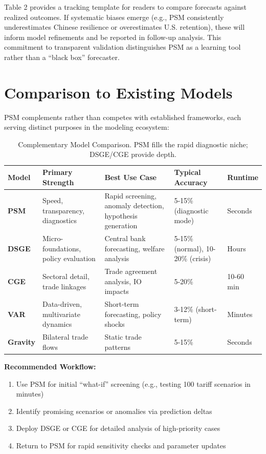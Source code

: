 \documentclass[11pt]{article}
\begin{document}
Table 2 provides a tracking template for readers to compare forecasts against realized outcomes. If systematic biases emerge (e.g., PSM consistently underestimates Chinese resilience or overestimates U.S. retention), these will inform model refinements and be reported in follow-up analysis. This commitment to transparent validation distinguishes PSM as a learning tool rather than a ``black box'' forecaster.

\section{Comparison to Existing Models}
PSM complements rather than competes with established frameworks, each serving distinct purposes in the modeling ecosystem:

\begin{table}[h]
\centering
\small
\begin{tabular}{p{2cm}p{3cm}p{3cm}p{3cm}p{2.5cm}}
\toprule
Model & Primary Strength & Best Use Case & Typical Accuracy & Runtime \\
\midrule
\textbf{PSM} & Speed, transparency, diagnostics & Rapid screening, anomaly detection, hypothesis generation & 5-15\% (diagnostic mode) & Seconds \\
\midrule
\textbf{DSGE} & Micro-foundations, policy evaluation & Central bank forecasting, welfare analysis & 5-15\% (normal), 10-20\% (crisis) & Hours \\
\midrule
\textbf{CGE} & Sectoral detail, trade linkages & Trade agreement analysis, IO impacts & 5-20\% & 10-60 min \\
\midrule
\textbf{VAR} & Data-driven, multivariate dynamics & Short-term forecasting, policy shocks & 3-12\% (short-term) & Minutes \\
\midrule
\textbf{Gravity} & Bilateral trade flows & Static trade patterns & 5-15\% & Seconds \\
\bottomrule
\end{tabular}
\caption{Complementary Model Comparison. PSM fills the rapid diagnostic niche; DSGE/CGE provide depth.}
\label{tab:comparison}
\end{table}

\textbf{Recommended Workflow:}
\begin{enumerate}
\item Use PSM for initial ``what-if'' screening (e.g., testing 100 tariff scenarios in minutes)
\item Identify promising scenarios or anomalies via prediction deltas
\item Deploy DSGE or CGE for detailed analysis of high-priority cases
\item Return to PSM for rapid sensitivity checks and parameter updates
\end{enumerate}
\end{document}
